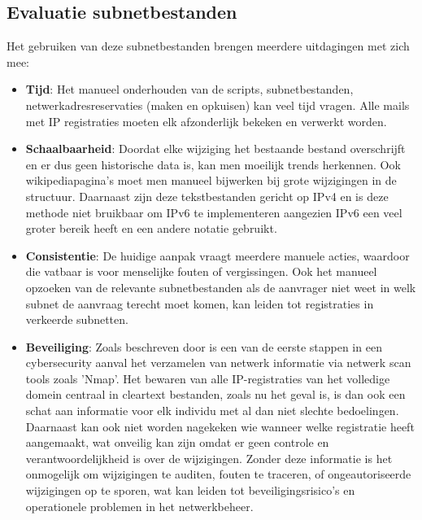 
\subsection{Evaluatie subnetbestanden}
\label{uitdagingen}
Het gebruiken van deze subnetbestanden brengen meerdere uitdagingen met zich mee:
\begin{itemize}
    \item \textbf{Tijd}: Het manueel onderhouden van de scripts, subnetbestanden, netwerkadresreservaties (maken en opkuisen) kan veel tijd vragen. Alle mails met IP registraties moeten elk afzonderlijk bekeken en verwerkt worden.
    \item \textbf{Schaalbaarheid}: Doordat elke wijziging het bestaande bestand overschrijft en er dus geen historische data is, kan men moeilijk trends herkennen. Ook wikipediapagina's moet men manueel bijwerken bij grote wijzigingen in de structuur. Daarnaast zijn deze tekstbestanden gericht op IPv4 en is deze methode niet bruikbaar om IPv6 te implementeren aangezien IPv6 een veel groter bereik heeft en een andere notatie gebruikt.
    \item \textbf{Consistentie}: De huidige aanpak vraagt meerdere manuele acties, waardoor die vatbaar is voor menselijke fouten of vergissingen. Ook het manueel opzoeken van de relevante subnetbestanden als de aanvrager niet weet in welk subnet de aanvraag terecht moet komen, kan leiden tot registraties in verkeerde subnetten.  
    \item \textbf{Beveiliging}: Zoals beschreven door \textcite{Liao2020} is een van de eerste stappen in een cybersecurity aanval het verzamelen van netwerk informatie via netwerk scan tools zoals 'Nmap'. Het bewaren van alle IP-registraties van het volledige domein centraal in cleartext bestanden, zoals nu het geval is, is dan ook een schat aan informatie voor elk individu met al dan niet slechte bedoelingen. Daarnaast kan ook niet worden nagekeken wie wanneer welke registratie heeft aangemaakt, wat onveilig kan zijn omdat er geen controle en verantwoordelijkheid is over de wijzigingen. Zonder deze informatie is het onmogelijk om wijzigingen te auditen, fouten te traceren, of ongeautoriseerde wijzigingen op te sporen, wat kan leiden tot beveiligingsrisico's en operationele problemen in het netwerkbeheer.
\end{itemize}


